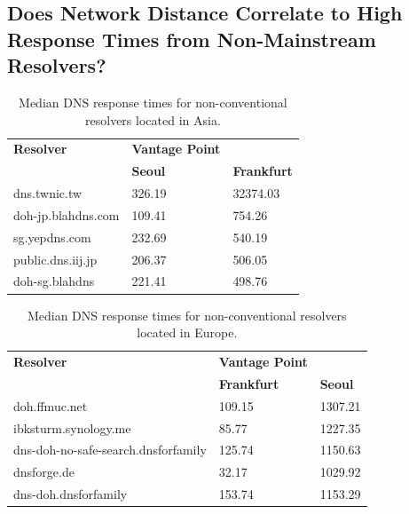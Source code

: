 \subsection{Does Network Distance Correlate to High Response Times from Non-Mainstream Resolvers?}
\begin{table}[ht]
\centering
\begin{tabular}{lll}
\toprule
\textbf{Resolver} & \textbf{Vantage Point} & \\
                  & \textbf{Seoul}         & \textbf{Frankfurt} \\
\midrule
dns.twnic.tw                                & 326.19                                           & 32374.03                            \\
doh-jp.blahdns.com                          & 109.41                                           & 754.26                              \\
sg.yepdns.com                               & 232.69                                           & 540.19                              \\
public.dns.iij.jp                           & 206.37                                           & 506.05                              \\
doh-sg.blahdns                              & 221.41                                           & 498.76                              \\
\bottomrule
\end{tabular}
\caption{Median DNS response times for non-conventional resolvers located in Asia.}
\label{tab:UnconvAsia}
\end{table}

\begin{table}[ht]
\centering
\begin{tabular}{lll}
\toprule
\textbf{Resolver} & \textbf{Vantage Point} & \\
                  & \textbf{Frankfurt}     & \textbf{Seoul} \\
\midrule
doh.ffmuc.net                               & 109.15                                           & 1307.21                         \\
ibksturm.synology.me                        & 85.77                                            & 1227.35                         \\
dns-doh-no-safe-search.dnsforfamily         & 125.74                                           & 1150.63                         \\
dnsforge.de                                 & 32.17                                            & 1029.92                         \\
dns-doh.dnsforfamily                        & 153.74                                           & 1153.29                         \\
\bottomrule
\end{tabular}
\caption{Median DNS response times for non-conventional resolvers located in Europe.}
\label{tab:UnconvEur}
\end{table}

